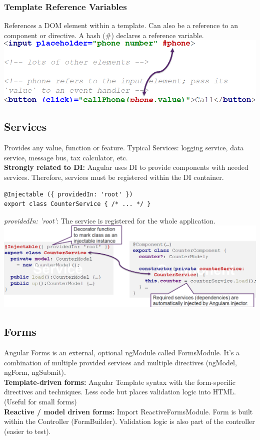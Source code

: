 \subsubsection{Template Reference Variables}
References a DOM element within a template.
Can also be a reference to an component or directive.
A hash (\#) declares a reference variable.\\
\includegraphics[width=0.7\linewidth]{img/angular_template_reference.png}


\subsection{Services}
Provides any value, function or feature.
Typical Services: logging service, data service, message bus, tax calculator, etc.\\
\textbf{Strongly related to DI:} Angular uses DI to provide components with needed services.
Therefore, services must be registered within the DI container.
\begin{lstlisting}
@Injectable ({ providedIn: 'root' })
export class CounterService { /* ... */ }
\end{lstlisting}
\textit{providedIn: 'root'}: The service is registered for the whole application.
\includegraphics[width=\linewidth]{img/angular_services.png}


\subsection{Forms}
Angular Forms is an external, optional ngModule called FormsModule.
It's a combination of multiple provided services and multiple directives (ngModel, ngForm, ngSubmit).\\
\textbf{Template-driven forms:} Angular Template syntax with the form-specific directives and techniques.
Less code but places validation logic into HTML. (Useful for small forms)\\
\textbf{Reactive / model driven forms:} Import ReactiveFormsModule.
Form is built within the Controller (FormBuilder).
Validation logic is also part of the controller (easier to test).

